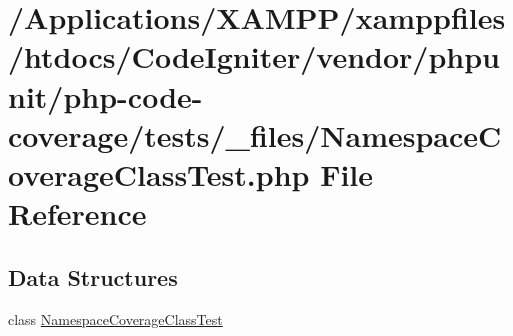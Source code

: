 \hypertarget{php-code-coverage_2tests_2__files_2_namespace_coverage_class_test_8php}{}\section{/\+Applications/\+X\+A\+M\+P\+P/xamppfiles/htdocs/\+Code\+Igniter/vendor/phpunit/php-\/code-\/coverage/tests/\+\_\+files/\+Namespace\+Coverage\+Class\+Test.php File Reference}
\label{php-code-coverage_2tests_2__files_2_namespace_coverage_class_test_8php}
\subsection*{Data Structures}
\begin{DoxyCompactItemize}
\item 
class \mbox{\hyperlink{class_namespace_coverage_class_test}{Namespace\+Coverage\+Class\+Test}}
\end{DoxyCompactItemize}
